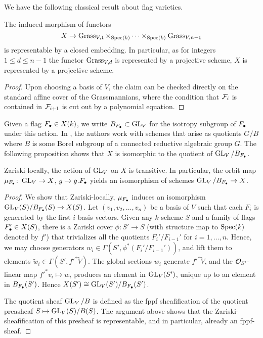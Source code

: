 \documentclass[../main.tex]{subfiles}
\begin{document}
We have the following classical result about flag varieties.
\begin{prop}\label{prop:FlagVarisProjective}
  The induced morphism of functors
  \begin{equation*}
    X \to \operatorname{Grass}_{V,1} \times_{\operatorname{Spec}(k)} \dots \times_{\operatorname{Spec}(k)}
    \operatorname{Grass}_{V,n-1}
  \end{equation*}
  is representable by a closed embedding. In particular, as for integers $1 \leq d \leq n-1$
  the functor $\operatorname{Grass}_{V,d}$ is represented by a projective scheme, 
  $X$ is represented by a projective scheme. 
\begin{proof}
  Upon choosing a basis of $V$, the claim can be checked directly on the
  standard affine cover of the Grassmannians, where the condition that $\mathcal{F}_i$ is
  contained in $\mathcal{F}_{i+1}$ is cut out by a polynomial equation.
\end{proof}
\end{prop}

Given a flag $F_\bullet \in
X(k)$, we write $B_{F_\bullet} \subset \operatorname{GL}_V$ for the isotropy subgroup of $F_\bullet$
under this action. In \cite{delignelusztig1976}, the authors work with schemes
that arise as quotients $G/B$ where $B$ is some Borel subgroup of a connected reductive
algebraic group $G$. 
The following proposition shows that $X$ is isomorphic to the quotient of
$\operatorname{GL}_V/B_{F_\bullet}$.

\begin{prop}\label{prop:FlagVarietyAsQuotient}
  Zariski-locally, the action of $\operatorname{GL}_V$ on $X$ is transitive. 
  In particular, the orbit map $\mu_{F_\bullet}\colon  \operatorname{GL}_V \to X$, $g \mapsto g.F_\bullet$
  yields an isomorphism of schemes $\operatorname{GL}_V/B_{F_\bullet} \to X$. 
\begin{proof}
  We show that Zariski-locally, $\mu_{F_\bullet}$ induces an isomorphism $\operatorname{GL}_V(S)/B_{F_\bullet}(S) \to X(S)$.
  Let $(v_1, v_2, \dots, v_n)$ be a basis of $V$ such that each $F_i$ is generated by the first $i$ basis vectors. 
  Given any $k$-scheme $S$ and a family of flags $F_\bullet' \in X(S)$, 
  there is a Zariski cover $\phi\colon  S' \to S$ (with structure map to $\operatorname{Spec}(k)$ denoted
by $f'$) that trivializes all the quotients $F_i'/F_{i-1}'$ for $i = 1, \dots,
  n$. Hence, we may choose generators $w_i \in \Gamma(S', \phi^*(F_i'/F_{i-1}'))$,
  and lift them to elements $\tilde w_i \in \Gamma(S', f'^* \tilde V)$. The global sections $w_i$ generate $f'^* \tilde V$, and the $\mathcal{O}_{S'}$-linear
map $f'^* v_i \mapsto w_i$ produces an element in $\operatorname{GL}_V(S')$, unique up to an element in $B_{F_\bullet}(S')$. Hence $X(S') \cong \operatorname{GL}_V(S')/B_{F_\bullet}(S')$.

  The quotient sheaf $\operatorname{GL}_V/B$ is defined as the fppf sheafification of the quotient preasheaf $S \mapsto \operatorname{GL}_V(S)/B(S)$.
  The argument above shows that the Zariski-sheafification of this presheaf is
  representable, and in particular, already an fppf-sheaf.
\end{proof}
\end{prop}
\end{document}
